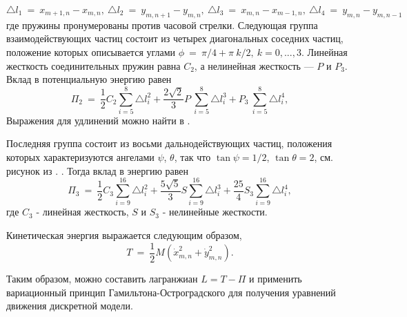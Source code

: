 \[
\triangle l_1~=~x_{m+1,n}-x_{m,n},~ \triangle l_2~=~y_{m,n+1}-y_{m,n},~\triangle l_3~=~x_{m,n}-x_{m-1,n},~ \triangle l_4~=~y_{m,n}-y_{m,n-1}
\]
где пружины пронумерованы против часовой стрелки. Следующая группа взаимодействующих частиц состоит из четырех диагональных соседних частиц, положение которых описывается углами $\phi~=~\pi/4+ \pi~k/2, ~k=0,...,3$. Линейная жесткость соединительных пружин равна $C_2$, а нелинейная жесткость --- $P$ и $P_3$. Вклад в потенциальную энергию равен
\[
\Pi_2~=~\frac{1}{2} C_2 \sum_{i=5}^{8}\triangle l_i^2+\frac{2\sqrt{2}}{3} P~ \sum_{i=5}^{8}\triangle l_i^3+ P_3~ \sum_{i=5}^{8}\triangle l_i^4,
\]
Выражения для удлинений можно найти в \cite {porkros}.

Последняя группа состоит из восьми дальнодействующих частиц, положения которых характеризуются ангелами $\psi$, $\theta$, так что $\tan \psi = 1/2$, $\tan \theta=2$, см. рисунок из \cite{porkros}. . Тогда вклад в энергию равен
$$
\Pi_3~=~\frac{1}{2} C_3 \sum_{i=9}^{16}\triangle l_i^2+\frac{5\sqrt{5}}{3} S \sum_{i=9}^{16}\triangle l_i^3+\frac{25}{4} S_3 \sum_{i=9}^{16}\triangle l_i^4,
$$
где $C_3$ - линейная жесткость, $S$ и $S_3$ - нелинейные жесткости.

Кинетическая энергия выражается следующим образом,
\[
T~=~\frac{1}{2} M\left(\dot{x}_{m,n}^2+\dot{y}_{m,n}^2\right).
\]

Таким образом, можно составить лагранжиан $L = T- \Pi$ и применить вариационный принцип Гамильтона-Остроградского для получения уравнений движения дискретной модели.%

